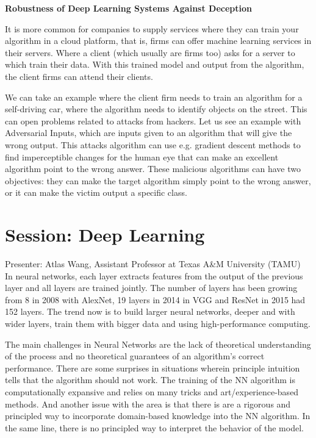 \documentclass[9pt,a4paper]{article}
\begin{document}
\textbf{Robustness of Deep Learning Systems Against Deception}

It is more common for companies to supply services where they can train your algorithm in a cloud platform, that is, firms can offer machine learning services in their servers. Where a client (which usually are firms too) asks for a server to which train their data. With this trained model and output from the algorithm, the client firms can attend their clients.

We can take an example where the client firm needs to train an algorithm for a self-driving car, where the algorithm needs to identify objects on the street. This can open problems related to attacks from hackers. 
Let us see an example with Adversarial Inputs, which are inputs given to an algorithm that will give the wrong output. 
This attacks algorithm can use e.g. gradient descent methods to find imperceptible changes for the human eye that can make an excellent algorithm point to the wrong answer. These malicious algorithms can have two objectives: they can make the target algorithm simply point to the wrong answer, or it can make the victim output a specific class.

\section*{Session: Deep Learning}

Presenter: Atlas Wang, Assistant Professor at Texas A\&M University (TAMU)\\

In neural networks, each layer extracts features from the output of the previous layer and all layers are trained jointly. 
The number of layers has been growing from 8 in 2008 with AlexNet, 19 layers in 2014 in VGG and ResNet in 2015 had 152 layers. 
The trend now is to build larger neural networks, deeper and with wider layers, train them with bigger data and using high-performance computing. 

The main challenges in Neural Networks are the lack of theoretical understanding of the process and no theoretical guarantees of an algorithm's correct performance. 
There are some surprises in situations wherein principle intuition tells that the algorithm should not work.
The training of the NN algorithm is computationally expansive and relies on many tricks and art/experience-based methods.
And another issue with the area is that there is are a rigorous and principled way to incorporate domain-based knowledge into the NN algorithm. 
In the same line, there is no principled way to interpret the behavior of the model.
\end{document}
